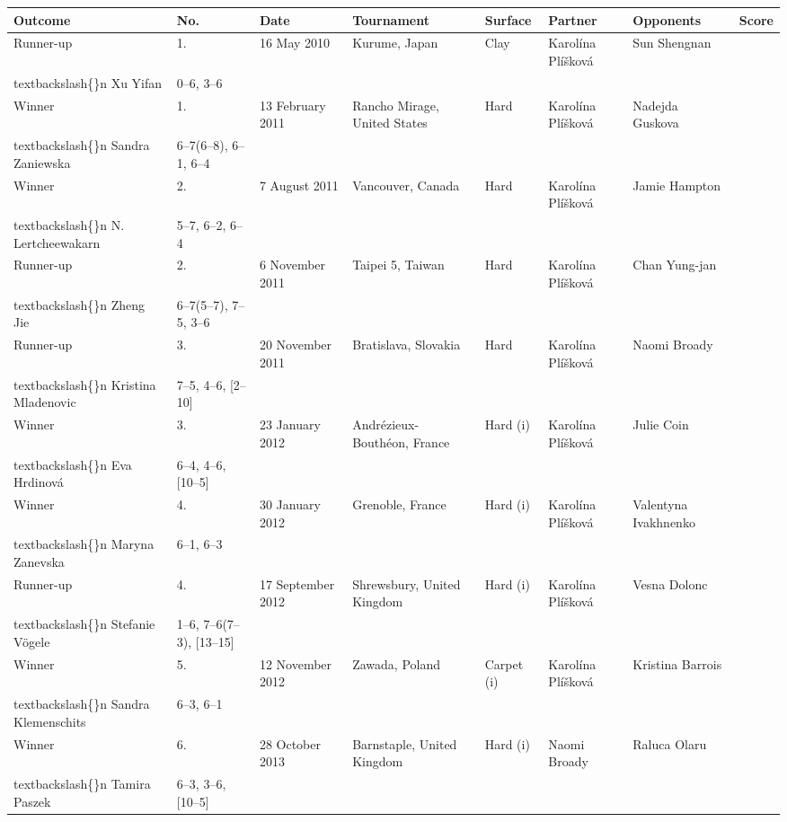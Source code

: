 \documentclass{article}
\begin{document}
\begin{tabular}{llllllll}
\toprule
Outcome & No. & Date & Tournament & Surface & Partner & Opponents & Score \\
\midrule
Runner-up & 1. & 16 May 2010 & Kurume, Japan & Clay & Karolína Plíšková & Sun Shengnan\\textbackslash\{\}n Xu Yifan & 0–6, 3–6 \\
Winner & 1. & 13 February 2011 & Rancho Mirage, United States & Hard & Karolína Plíšková & Nadejda Guskova\\textbackslash\{\}n Sandra Zaniewska & 6–7(6–8), 6–1, 6–4 \\
Winner & 2. & 7 August 2011 & Vancouver, Canada & Hard & Karolína Plíšková & Jamie Hampton\\textbackslash\{\}n N. Lertcheewakarn & 5–7, 6–2, 6–4 \\
Runner-up & 2. & 6 November 2011 & Taipei 5, Taiwan & Hard & Karolína Plíšková & Chan Yung-jan\\textbackslash\{\}n Zheng Jie & 6–7(5–7), 7–5, 3–6 \\
Runner-up & 3. & 20 November 2011 & Bratislava, Slovakia & Hard & Karolína Plíšková & Naomi Broady\\textbackslash\{\}n Kristina Mladenovic & 7–5, 4–6, [2–10] \\
Winner & 3. & 23 January 2012 & Andrézieux-Bouthéon, France & Hard (i) & Karolína Plíšková & Julie Coin\\textbackslash\{\}n Eva Hrdinová & 6–4, 4–6, [10–5] \\
Winner & 4. & 30 January 2012 & Grenoble, France & Hard (i) & Karolína Plíšková & Valentyna Ivakhnenko\\textbackslash\{\}n Maryna Zanevska & 6–1, 6–3 \\
Runner-up & 4. & 17 September 2012 & Shrewsbury, United Kingdom & Hard (i) & Karolína Plíšková & Vesna Dolonc\\textbackslash\{\}n Stefanie Vögele & 1–6, 7–6(7–3), [13–15] \\
Winner & 5. & 12 November 2012 & Zawada, Poland & Carpet (i) & Karolína Plíšková & Kristina Barrois\\textbackslash\{\}n Sandra Klemenschits & 6–3, 6–1 \\
Winner & 6. & 28 October 2013 & Barnstaple, United Kingdom & Hard (i) & Naomi Broady & Raluca Olaru\\textbackslash\{\}n Tamira Paszek & 6–3, 3–6, [10–5] \\
\bottomrule
\end{tabular}
\end{document}
